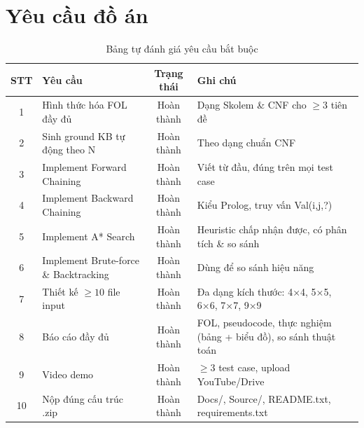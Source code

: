 \section{Yêu cầu đồ án}
\begin{table}[H]
\centering
\caption{Bảng tự đánh giá yêu cầu bắt buộc}

\renewcommand{\arraystretch}{1.5}
\begin{tabular}{|c|p{5cm}|c|p{6cm}|}
\hline
\textbf{STT} & \textbf{Yêu cầu} & \textbf{Trạng thái} & \textbf{Ghi chú} \\
\hline

1 & Hình thức hóa FOL đầy đủ & Hoàn thành & Dạng Skolem \& CNF cho $\geq 3$ tiên đề \\
\hline

2 & Sinh ground KB tự động theo N & Hoàn thành & Theo dạng chuẩn CNF \\
\hline

3 & Implement Forward Chaining & Hoàn thành & Viết từ đầu, đúng trên mọi test case \\
\hline

4 & Implement Backward Chaining & Hoàn thành & Kiểu Prolog, truy vấn Val(i,j,?) \\
\hline

5 & Implement A* Search & Hoàn thành & Heuristic chấp nhận được, có phân tích \& so sánh \\
\hline

6 & Implement Brute-force \& Backtracking & Hoàn thành & Dùng để so sánh hiệu năng \\
\hline

7 & Thiết kế $\geq 10$ file input & Hoàn thành & Đa dạng kích thước: 4×4, 5×5, 6×6, 7×7, 9×9 \\
\hline

8 & Báo cáo đầy đủ & Hoàn thành & FOL, pseudocode, thực nghiệm (bảng + biểu đồ), so sánh thuật toán \\
\hline

9 & Video demo & Hoàn thành & $\geq 3$ test case, upload YouTube/Drive \\
\hline

10 & Nộp đúng cấu trúc .zip & Hoàn thành & Docs/, Source/, README.txt, requirements.txt \\
\hline

\end{tabular}
\end{table}